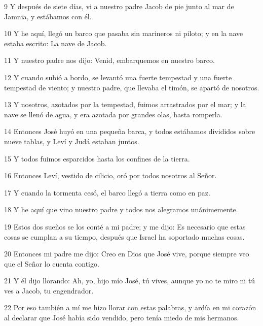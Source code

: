 \par 9 Y después de siete días, vi a nuestro padre Jacob de pie junto al mar de Jamnia, y estábamos con él.

\par 10 Y he aquí, llegó un barco que pasaba sin marineros ni piloto; y en la nave estaba escrito: La nave de Jacob.

\par 11 Y nuestro padre nos dijo: Venid, embarquemos en nuestro barco.

\par 12 Y cuando subió a bordo, se levantó una fuerte tempestad y una fuerte tempestad de viento; y nuestro padre, que llevaba el timón, se apartó de nosotros.

\par 13 Y nosotros, azotados por la tempestad, fuimos arrastrados por el mar; y la nave se llenó de agua, y era azotada por grandes olas, hasta romperla.

\par 14 Entonces José huyó en una pequeña barca, y todos estábamos divididos sobre nueve tablas, y Leví y Judá estaban juntos.

\par 15 Y todos fuimos esparcidos hasta los confines de la tierra.

\par 16 Entonces Leví, vestido de cilicio, oró por todos nosotros al Señor.

\par 17 Y cuando la tormenta cesó, el barco llegó a tierra como en paz.

\par 18 Y he aquí que vino nuestro padre y todos nos alegramos unánimemente.

\par 19 Estos dos sueños se los conté a mi padre; y me dijo: Es necesario que estas cosas se cumplan a su tiempo, después que Israel ha soportado muchas cosas.

\par 20 Entonces mi padre me dijo: Creo en Dios que José vive, porque siempre veo que el Señor lo cuenta contigo.

\par 21 Y él dijo llorando: Ah, yo, hijo mío José, tú vives, aunque yo no te miro ni tú ves a Jacob, tu engendrador.

\par 22 Por eso también a mí me hizo llorar con estas palabras, y ardía en mi corazón al declarar que José había sido vendido, pero tenía miedo de mis hermanos.

